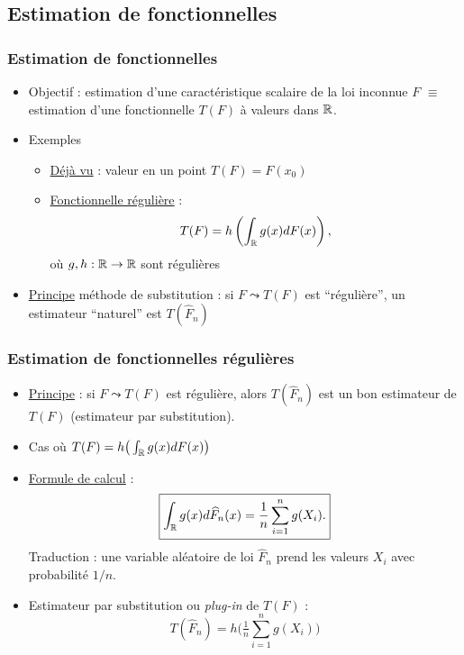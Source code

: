 \subsection{Estimation de fonctionnelles}
\begin{frame}
\frametitle{Estimation de fonctionnelles}
\begin{itemize}
\item \alert{Objectif :} estimation d'une caractéristique
scalaire de la loi inconnue $F$ $\equiv$ estimation d'une
fonctionnelle $T(F)$ à valeurs dans $\operatorname{{\mathbb R}}$.
\item Exemples
\begin{itemize}
\item \underline{Déjà vu} : valeur en un point  $T(F) = F(x_0)$
\item \underline{Fonctionnelle régulière} :
$$T(F) = h\left(\int_{\operatorname{{\mathbb R}}}g(x)dF(x)\right),$$
où $g,h: \operatorname{{\mathbb R}} \rightarrow \operatorname{{\mathbb R}}$ sont \alert{régulières}
\end{itemize}
\item \underline{Principe} \alert{méthode de substitution} : si $F \leadsto T(F)$ est
``régulière'', un estimateur ``naturel'' est $T(\widehat{F}_n)$

\end{itemize}
\end{frame}

\begin{frame}
\frametitle{Estimation de fonctionnelles régulières}
\begin{itemize}
\item \underline{Principe} : si $F \leadsto T(F)$ est \alert{régulière},
alors $T(\widehat F_n)$  est un \alert{bon}  estimateur de $T(F)$ (estimateur par substitution).
\item Cas où $T(F) = h\big(\int_{\operatorname{{\mathbb R}}}g(x)dF(x)\big)$
\item \underline{Formule de calcul} :
$$\boxed{\int_{\operatorname{{\mathbb R}}}g(x)d\widehat F_n(x) =
\frac{1}{n}\sum_{i = 1}^n g(X_i).}$$ Traduction : \alert{une
variable aléatoire de loi $\widehat F_n$ prend les valeurs $X_i$
avec probabilité $1/n$.}
\item Estimateur par \alert{substitution} ou {\it plug-in} de $T(F)$ :
$$\boxed{T(\widehat F_n) = h\Big(\tfrac{1}{n}\sum_{i = 1}^ng(X_i)\Big)}$$
\end{itemize}
\end{frame}




